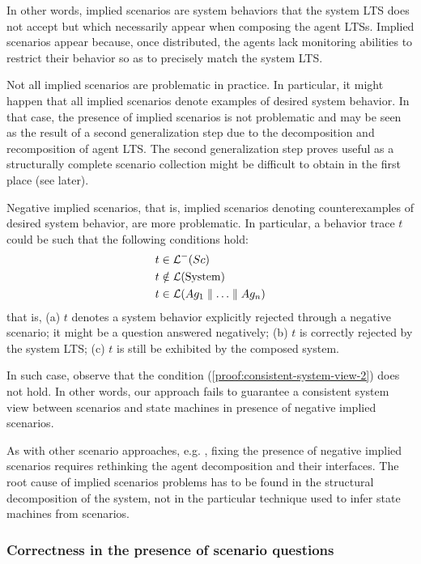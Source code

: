 In other words, implied scenarios are system behaviors that the system LTS does not accept but which necessarily appear when composing the agent LTSs. Implied scenarios appear because, once distributed, the agents lack monitoring abilities to restrict their behavior so as to precisely match the system LTS.

Not all implied scenarios are problematic in practice. In particular, it might happen that all implied scenarios denote examples of desired system behavior. In that case, the presence of implied scenarios is not problematic and may be seen as the result of a second generalization step due to the decomposition and recomposition of agent LTS. The second generalization step proves useful as a structurally complete scenario collection might be difficult to obtain in the first place (see later).

Negative implied scenarios, that is, implied scenarios denoting counterexamples of desired system behavior, are more problematic. In particular, a behavior trace $t$ could be such that the following conditions hold:
\begin{align}
&t \in \mathcal{L}^-(Sc)\\
&t \notin \mathcal{L}(\mbox{System})\\
&t \in \mathcal{L}(Ag_1 \parallel \ldots \parallel Ag_n)
\end{align}
that is, (a) $t$ denotes a system behavior explicitly rejected through a negative scenario; it might be a question answered negatively; (b) $t$ is correctly rejected by the system LTS; (c) $t$ is still be exhibited by the composed system.

In such case, observe that the condition (\ref{proof:consistent-system-view-2}) does not hold. In other words, our approach fails to guarantee a consistent system view between scenarios and state machines in presence of negative implied scenarios.

As with other scenario approaches, e.g. \cite{Alur:2000, Uchitel:2004}, fixing the presence of negative implied scenarios requires rethinking the agent decomposition and their interfaces. The root cause of implied scenarios problems has to be found in the structural decomposition of the system, not in the particular technique used to infer state machines from scenarios.

\subsubsection*{Correctness in the presence of scenario questions}

